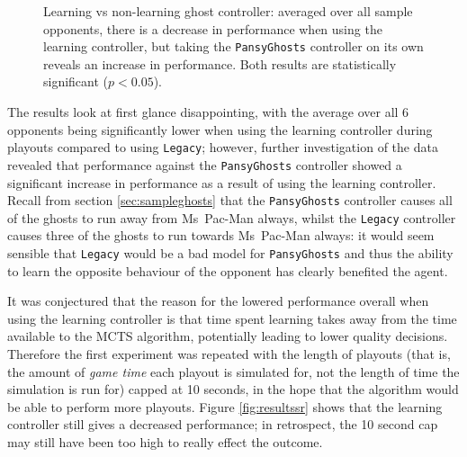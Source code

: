 \begin{figure}
\centering
{}
\caption[Learning vs non-learning ghost controller]{Learning vs non-learning ghost controller: averaged over all sample opponents, there is a decrease in performance when using the learning controller, but taking the {\tt PansyGhosts} controller on its own reveals an increase in performance.  Both results are statistically significant ($p < 0.05$).}
\label{fig:results1}
\end{figure}

The results look at first glance disappointing, with the average over all 6 opponents being significantly lower when using the learning controller during playouts compared to using {\tt Legacy}; however, further investigation of the data revealed that performance against the {\tt PansyGhosts} controller showed a significant increase in performance as a result of using the learning controller.  Recall from section \ref{sec:sampleghosts} that the {\tt PansyGhosts} controller causes all of the ghosts to run away from Ms~Pac-Man always, whilst the {\tt Legacy} controller causes three of the ghosts to run towards Ms~Pac-Man always: it would seem sensible that {\tt Legacy} would be a bad model for {\tt PansyGhosts} and thus the ability to learn the opposite behaviour of the opponent has clearly benefited the agent.

It was conjectured that the reason for the lowered performance overall when using the learning controller is that time spent learning takes away from the time available to the MCTS algorithm, potentially leading to lower quality decisions.  Therefore the first experiment was repeated with the length of playouts (that is, the amount of \emph{game time} each playout is simulated for, not the length of time the simulation is run for) capped at 10 seconds, in the hope that the algorithm would be able to perform more playouts.  Figure \ref{fig:resultssr} shows that the learning controller still gives a decreased performance; in retrospect, the 10 second cap may still have been too high to really effect the outcome.

